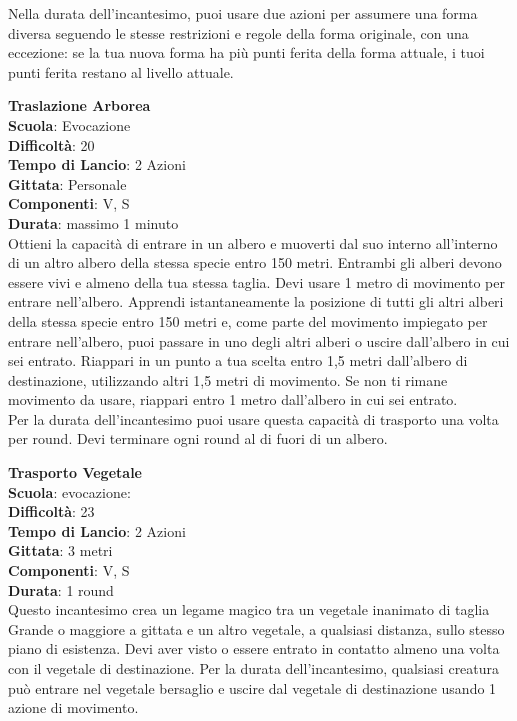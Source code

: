\begin{multicols}{2}
Nella durata dell'incantesimo, puoi usare due azioni per assumere una forma diversa seguendo le stesse restrizioni e regole della forma originale, con una eccezione: se la tua nuova forma ha più punti ferita  della forma attuale, i tuoi punti ferita restano al livello attuale.

\medskip\textbf{Traslazione Arborea}\\
\textbf{Scuola}: Evocazione\\
\textbf{Difficoltà}:  20\\
\textbf{Tempo di Lancio}: 2 Azioni\\
\textbf{Gittata}: Personale\\
\textbf{Componenti}: V, S\\
\textbf{Durata}: massimo 1 minuto\\
Ottieni la capacità di entrare in un albero e muoverti dal suo interno all'interno di un altro albero della stessa specie entro 150 metri. Entrambi gli alberi devono essere vivi e almeno della tua stessa taglia. Devi usare 1 metro di movimento per entrare nell'albero. Apprendi istantaneamente la posizione di tutti gli altri alberi della stessa specie entro 150 metri e, come parte del movimento impiegato per entrare nell'albero, puoi passare in uno degli altri alberi o uscire dall'albero in cui sei entrato. Riappari in un punto a tua scelta entro 1,5 metri dall'albero di destinazione, utilizzando altri 1,5 metri di movimento. Se non ti rimane movimento da usare, riappari entro 1 metro dall'albero in cui sei entrato.\\
Per la durata dell'incantesimo puoi usare questa capacità di trasporto una volta per round. Devi terminare ogni round al di fuori di un albero.

\medskip\textbf{Trasporto Vegetale}\\
\textbf{Scuola}: evocazione:\\
\textbf{Difficoltà}:  23\\
\textbf{Tempo di Lancio}: 2 Azioni\\
\textbf{Gittata}: 3 metri\\
\textbf{Componenti}: V, S\\
\textbf{Durata}: 1 round\\
Questo incantesimo crea un legame magico tra un vegetale inanimato di taglia Grande o maggiore a gittata e un altro vegetale, a qualsiasi distanza, sullo stesso piano di esistenza. Devi aver visto o essere entrato in contatto almeno una volta con il vegetale di destinazione. Per la durata dell'incantesimo, qualsiasi creatura può entrare nel vegetale bersaglio e uscire dal vegetale di destinazione usando 1 azione di movimento.


\end{multicols}
